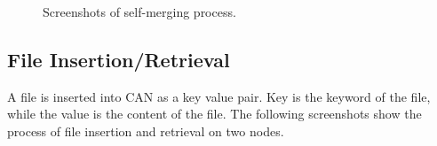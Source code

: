 \documentclass[11pt, oneside]{article}   	%
\begin{document}
\begin{figure}[htbp] %
   \centering
   \caption{Screenshots of self-merging process.}
   \label{fig:screenshot}
\end{figure} 

\subsection{File Insertion/Retrieval}
A file is inserted into CAN as a key value pair. Key is the keyword of the file, while the value is the content of the file. The following screenshots show the process of file insertion and retrieval on two nodes.
\end{document}
